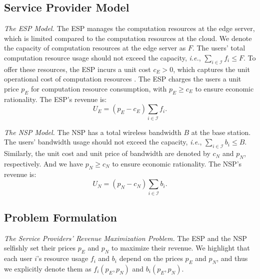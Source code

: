 \documentclass[lettersize,journal]{IEEEtran}
\newcommand{\ie}{\emph{i.e.}}
\begin{document}
\subsection{Service Provider Model}\label{sec_provider_model}
\emph{The ESP Model.} The ESP manages the computation resources at the edge server, which is limited compared to the computation resources at the cloud\cite{tutuncuoglu2024joint,Nguyen2021Price,mach2017mobile}.
We denote the capacity of computation resources at the edge server as $F$. The users' total computation resource usage should not exceed the capacity, \ie, $\sum_{i\in\mathcal{I}}f_i\le F$.
To offer these resources, the ESP incurs a unit cost $c_E > 0$, which captures the unit operational cost of computation resources \cite{ding2023optimal,xiang2024TSBG}.
The ESP charges the users a unit price $p_E$ for computation resource consumption, with $p_E \ge c_E$ to ensure economic rationality. The ESP's revenue is:
\begin{equation}\label{Equation:U_E}
    U_E = (p_E - c_E) \sum_{i \in \mathcal{I}} f_i.
\end{equation}


\emph{The NSP Model.} The NSP has a total wireless bandwidth $B$ at the base station. The users' bandwidth usage should not exceed the capacity, \ie, $\sum_{i\in\mathcal{I}}b_i\le B$. Similarly, the unit cost and unit price of bandwidth are denoted by $c_N$ and $p_N$, respectively. And we have $p_N\ge c_N$ to ensure economic rationality. The NSP's revenue is:
\begin{equation}\label{Equation:U_N}
    U_N = (p_N - c_N) \sum_{i \in \mathcal{I}} b_i.
\end{equation}

\subsection{Problem Formulation}\label{sec:problem_formulation}
\emph{The Service Providers' Revenue Maximization Problem.}
The ESP and the NSP selfishly set their prices $p_E$ and $p_N$ to maximize their revenue. 
We highlight that each user $i$'s resource usage $f_i$ and $b_i$ depend on the prices $p_E$ and $p_N$, and thus we explicitly denote them as $f_i(p_E,p_N)$ and $b_i(p_E,p_N)$.
\end{document}
